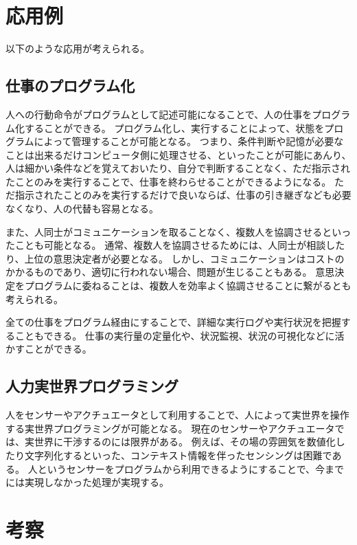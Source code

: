 \section{応用例}\label{ux5fdcux7528ux4f8b}

以下のような応用が考えられる。

\subsection{仕事のプログラム化}\label{ux4ed5ux4e8bux306eux30d7ux30edux30b0ux30e9ux30e0ux5316}

人への行動命令がプログラムとして記述可能になることで、人の仕事をプログラム化することができる。
プログラム化し、実行することによって、状態をプログラムによって管理することが可能となる。
つまり、条件判断や記憶が必要なことは出来るだけコンピュータ側に処理させる、といったことが可能にあんり、人は細かい条件などを覚えておいたり、自分で判断することなく、ただ指示されたことのみを実行することで、仕事を終わらせることができるようになる。
ただ指示されたことのみを実行するだけで良いならば、仕事の引き継ぎなども必要なくなり、人の代替も容易となる。

また、人同士がコミュニケーションを取ることなく、複数人を協調させるといったことも可能となる。
通常、複数人を協調させるためには、人同士が相談したり、上位の意思決定者が必要となる。
しかし、コミュニケーションはコストのかかるものであり、適切に行われない場合、問題が生じることもある。
意思決定をプログラムに委ねることは、複数人を効率よく協調させることに繋がるとも考えられる。

全ての仕事をプログラム経由にすることで、詳細な実行ログや実行状況を把握することもできる。
仕事の実行量の定量化や、状況監視、状況の可視化などに活かすことができる。

\subsection{人力実世界プログラミング}\label{ux4ebaux529bux5b9fux4e16ux754cux30d7ux30edux30b0ux30e9ux30dfux30f3ux30b0}

人をセンサーやアクチュエータとして利用することで、人によって実世界を操作する実世界プログラミングが可能となる。
現在のセンサーやアクチュエータでは、実世界に干渉するのには限界がある。
例えば、その場の雰囲気を数値化したり文字列化するといった、コンテキスト情報を伴ったセンシングは困難である。
人というセンサーをプログラムから利用できるようにすることで、今までには実現しなかった処理が実現する。

\section{考察}\label{ux8003ux5bdf}


